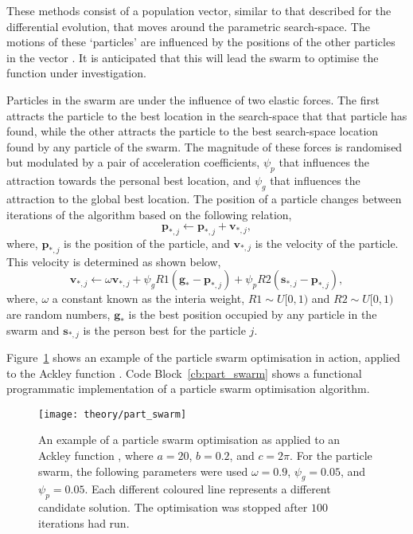 These methods consist of a population vector, similar to that described for the differential evolution, that moves around the parametric search-space.
The motions of these `particles' are influenced by the positions of the other particles in the vector \cite{poli_analysis_2008}.
It is anticipated that this will lead the swarm to optimise the function under investigation.

Particles in the swarm are under the influence of two elastic forces.
The first attracts the particle to the best location in the search-space that that particle has found, while the other attracts the particle to the best search-space location found by any particle of the swarm.
The magnitude of these forces is randomised but modulated by a pair of acceleration coefficients, $\psi_p$ that influences the attraction towards the personal best location, and $\psi_g$ that influences the attraction to the global best location.
The position of a particle changes between iterations of the algorithm based on the following relation,
%
\begin{equation}
\mathbf{p}_{*,j} \leftarrow \mathbf{p}_{*,j} + \mathbf{v}_{*,j},
\end{equation}
%
where, $\mathbf{p}_{*,j}$ is the position of the particle, and $\mathbf{v}_{*,j}$ is the velocity of the particle.
This velocity is determined as shown below,
%
\begin{equation}
\mathbf{v}_{*,j} \leftarrow \omega\mathbf{v}_{*,j} + \psi_gR1(\mathbf{g}_{*} - \mathbf{p}_{*,j}) + \psi_pR2(\mathbf{s}_{*,j} - \mathbf{p}_{*,j}),
\end{equation}
%
where, $\omega$ a constant known as the interia weight, $R1\sim U[0, 1)$ and $R2\sim U[0, 1)$ are random numbers, $\mathbf{g}_{*}$ is the best position occupied by any particle in the swarm and $\mathbf{s}_{*,j}$ is the person best for the particle $j$.

Figure~\ref{fig:part_swarm} shows an example of the particle swarm optimisation in action, applied to the Ackley function \cite{ackley_connectionist_1987}. Code Block~\ref{cb:part_swarm} shows a functional programmatic implementation of a particle swarm optimisation algorithm.
%
\begin{figure}
    \centering
    \texttt{[image: theory/part\_swarm]}
    \caption{An example of a particle swarm optimisation as applied to an Ackley function \cite{ackley_connectionist_1987}, where $a=20$, $b=0.2$, and $c=2\pi$. For the particle swarm, the following parameters were used $\omega=0.9$, $\psi_g=0.05$, and $\psi_p=0.05$. Each different coloured line represents a different candidate solution. The optimisation was stopped after $100$ iterations had run.}
    \label{fig:part_swarm}
\end{figure}
%
\begin{figure}
    \centering
        
\end{figure}
%

